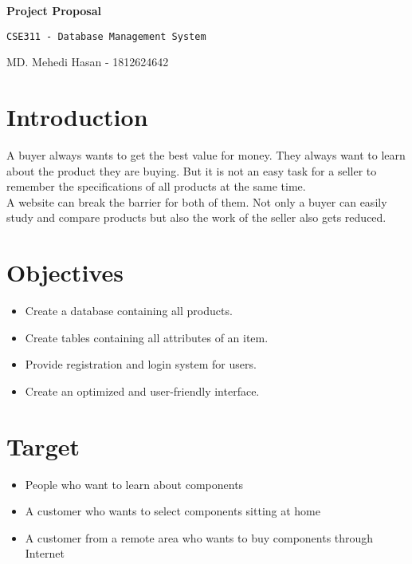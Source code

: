 \documentclass[12pt]{article}
\begin{document}
\begin{center}
\LARGE{{\textbf{\textsf{}Project Proposal\textbf{}}}}
\end{center}

\begin{center}
\Large{\texttt{CSE311 - Database Management System}}
\end{center}

\begin{center}
\large MD. Mehedi Hasan - \large 1812624642
\end{center}

\section*{Introduction}

A buyer always wants to get the best value for money. They always want to learn about the product they are buying. But it is not an easy task for a seller to remember the specifications of all products at the same time. \\
A website can break the barrier for both of them. Not only a buyer can easily study and compare products but also the work of the seller also gets reduced.

\section*{Objectives}
\begin{itemize}
\item  Create a database containing all products. 
\item  Create tables containing all attributes of an item. 
\item  Provide registration and login system for users.
\item  Create an optimized and user-friendly interface.
\end{itemize}

\section*{Target}
\begin{itemize}
\item  People who want to learn about components
\item  A customer who wants to select components sitting at home
\item  A customer from a remote area who wants to buy components through Internet
\end{itemize}
\end{document}
